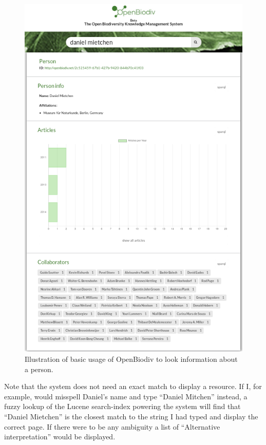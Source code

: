 \begin{figure}
\centering
\includegraphics[width=\textwidth]{Figures/basic-level.png}
\decoRule
\caption{Illustration of basic usage of OpenBiodiv to look information about a person.}
\label{fig:basic-level}
\end{figure}

Note that the system does not need an exact match to display a resource. If I, for example, would misspell Daniel's name and type ``Daniel Mitchen'' instead, a fuzzy lookup of the Lucene search-index powering the system will find that ``Daniel Mietchen'' is the closest match to the string I had typed and display the correct page. If there were to be any ambiguity a list of ``Alternative interpretation'' would be displayed.

